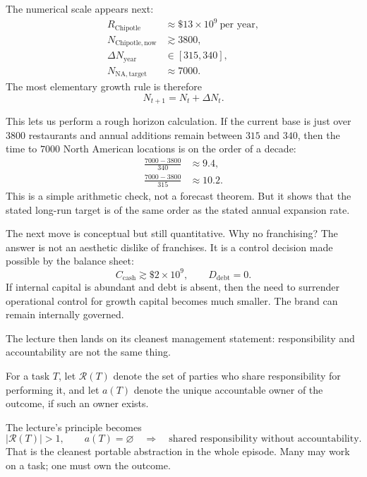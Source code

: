 The numerical scale appears next:
\begin{align}
R_{\mathrm{Chipotle}} &\approx \$13\times 10^9 \ \text{per year}, \\
N_{\mathrm{Chipotle,now}} &\gtrsim 3800, \\
\Delta N_{\mathrm{year}} &\in [315,340], \\
N_{\mathrm{NA,target}} &\approx 7000 .
\end{align}
The most elementary growth rule is therefore
\begin{equation}
N_{t+1}=N_t+\Delta N_t.
\end{equation}

This lets us perform a rough horizon calculation. If the current base is just over \(3800\) restaurants and annual additions remain between \(315\) and \(340\), then the time to \(7000\) North American locations is on the order of a decade:
\begin{align}
\frac{7000-3800}{340} &\approx 9.4, \\
\frac{7000-3800}{315} &\approx 10.2.
\end{align}
This is a simple arithmetic check, not a forecast theorem. But it shows that the stated long-run target is of the same order as the stated annual expansion rate.

The next move is conceptual but still quantitative. Why no franchising? The answer is not an aesthetic dislike of franchises. It is a control decision made possible by the balance sheet:
\begin{equation}
C_{\mathrm{cash}}\gtrsim \$2\times 10^9, \qquad D_{\mathrm{debt}}=0.
\end{equation}
If internal capital is abundant and debt is absent, then the need to surrender operational control for growth capital becomes much smaller. The brand can remain internally governed.

The lecture then lands on its cleanest management statement: responsibility and accountability are not the same thing.

\begin{definition}
For a task \(T\), let \(\mathcal R(T)\) denote the set of parties who share responsibility for performing it, and let \(a(T)\) denote the unique accountable owner of the outcome, if such an owner exists.
\end{definition}

The lecture's principle becomes
\begin{equation}
|\mathcal R(T)|>1,\qquad a(T)=\varnothing
\quad \Longrightarrow \quad
\text{shared responsibility without accountability.}
\end{equation}
That is the cleanest portable abstraction in the whole episode. Many may work on a task; one must own the outcome.

